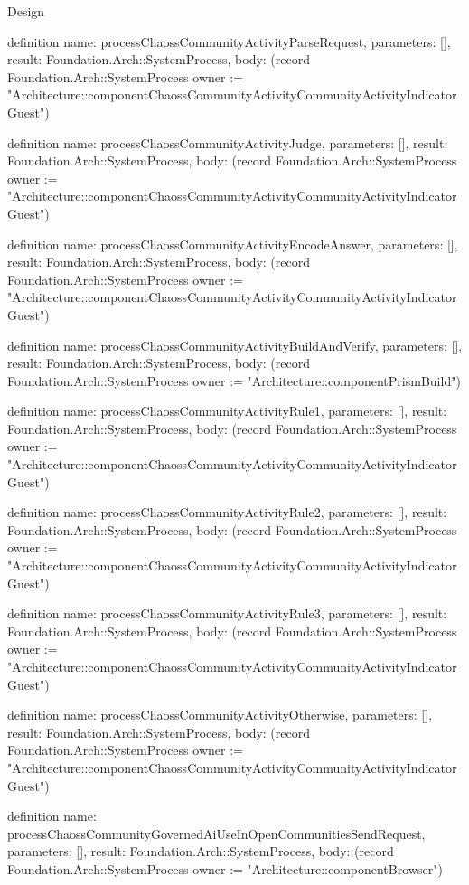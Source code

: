 \begin{lexlean}{Design}
\begin{semanticmodule}
definition{
  name: processChaossCommunityActivityParseRequest,
  parameters: [],
  result: Foundation.Arch::SystemProcess,
  body: (record Foundation.Arch::SystemProcess {owner := "Architecture::componentChaossCommunityActivityCommunityActivityIndicatorGuest"})
}

definition{
  name: processChaossCommunityActivityJudge,
  parameters: [],
  result: Foundation.Arch::SystemProcess,
  body: (record Foundation.Arch::SystemProcess {owner := "Architecture::componentChaossCommunityActivityCommunityActivityIndicatorGuest"})
}

definition{
  name: processChaossCommunityActivityEncodeAnswer,
  parameters: [],
  result: Foundation.Arch::SystemProcess,
  body: (record Foundation.Arch::SystemProcess {owner := "Architecture::componentChaossCommunityActivityCommunityActivityIndicatorGuest"})
}

definition{
  name: processChaossCommunityActivityBuildAndVerify,
  parameters: [],
  result: Foundation.Arch::SystemProcess,
  body: (record Foundation.Arch::SystemProcess {owner := "Architecture::componentPrismBuild"})
}

definition{
  name: processChaossCommunityActivityRule1,
  parameters: [],
  result: Foundation.Arch::SystemProcess,
  body: (record Foundation.Arch::SystemProcess {owner := "Architecture::componentChaossCommunityActivityCommunityActivityIndicatorGuest"})
}

definition{
  name: processChaossCommunityActivityRule2,
  parameters: [],
  result: Foundation.Arch::SystemProcess,
  body: (record Foundation.Arch::SystemProcess {owner := "Architecture::componentChaossCommunityActivityCommunityActivityIndicatorGuest"})
}

definition{
  name: processChaossCommunityActivityRule3,
  parameters: [],
  result: Foundation.Arch::SystemProcess,
  body: (record Foundation.Arch::SystemProcess {owner := "Architecture::componentChaossCommunityActivityCommunityActivityIndicatorGuest"})
}

definition{
  name: processChaossCommunityActivityOtherwise,
  parameters: [],
  result: Foundation.Arch::SystemProcess,
  body: (record Foundation.Arch::SystemProcess {owner := "Architecture::componentChaossCommunityActivityCommunityActivityIndicatorGuest"})
}

definition{
  name: processChaossCommunityGovernedAiUseInOpenCommunitiesSendRequest,
  parameters: [],
  result: Foundation.Arch::SystemProcess,
  body: (record Foundation.Arch::SystemProcess {owner := "Architecture::componentBrowser"})
}


\end{semanticmodule}
\end{lexlean}
